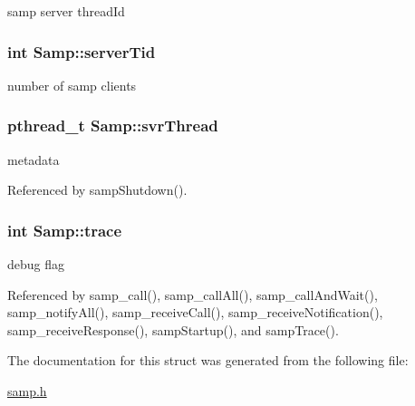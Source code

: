 samp server threadId \hypertarget{structSamp_69b05b2fa1ab19729d81659ad64387a0}{
\subsubsection[{serverTid}]{\setlength{\rightskip}{0pt plus 5cm}int {\bf Samp::serverTid}}}
\label{structSamp_69b05b2fa1ab19729d81659ad64387a0}


number of samp clients \hypertarget{structSamp_e7db0cac0c4ad61c9ed7f3d344b623cf}{
\subsubsection[{svrThread}]{\setlength{\rightskip}{0pt plus 5cm}pthread\_\-t {\bf Samp::svrThread}}}
\label{structSamp_e7db0cac0c4ad61c9ed7f3d344b623cf}


metadata 

Referenced by sampShutdown().\hypertarget{structSamp_25ddaf846639c7c67ea651a578b804ad}{
\subsubsection[{trace}]{\setlength{\rightskip}{0pt plus 5cm}int {\bf Samp::trace}}}
\label{structSamp_25ddaf846639c7c67ea651a578b804ad}


debug flag 

Referenced by samp\_\-call(), samp\_\-callAll(), samp\_\-callAndWait(), samp\_\-notifyAll(), samp\_\-receiveCall(), samp\_\-receiveNotification(), samp\_\-receiveResponse(), sampStartup(), and sampTrace().

The documentation for this struct was generated from the following file:\begin{CompactItemize}
\item 
\hyperlink{samp_8h}{samp.h}\end{CompactItemize}
